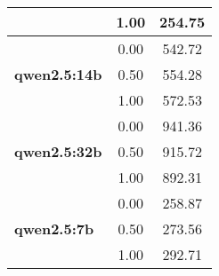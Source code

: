 \begin{table}[htbp]
\begin{tabular}{lcc}
     & 1.00 & 254.75 \\
    \midrule
    \multirow{3}{*}{\textbf{qwen2.5:14b}} & 0.00 & 542.72 \\
     & 0.50 & 554.28 \\
     & 1.00 & 572.53 \\
    \midrule
    \multirow{3}{*}{\textbf{qwen2.5:32b}} & 0.00 & 941.36 \\
     & 0.50 & 915.72 \\
     & 1.00 & 892.31 \\
    \midrule
    \multirow{3}{*}{\textbf{qwen2.5:7b}} & 0.00 & 258.87 \\
     & 0.50 & 273.56 \\
     & 1.00 & 292.71 \\
    \bottomrule
  \end{tabular}
\end{table}
